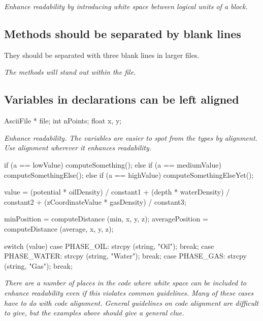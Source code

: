 \documentclass[a4paper,11pt,oneside]{scrbook}
\newcommand{\guideline}[1]{{\subsection{#1}}}
\newcommand{\motivation}[1]{{\normalfont \itshape #1}}
\begin{document}
\motivation{
  Enhance readability by introducing white space between logical units of a block.
}

\guideline{Methods should be separated by blank lines}

They should be separated with three blank lines in larger files.

\motivation{
  The methods will stand out within the file.
}

\guideline{Variables in declarations can be left aligned}

\begin{code}
  AsciiFile *  file;
  int          nPoints;
  float        x, y;
\end{code}

\motivation{
  Enhance readability. The variables are easier to spot from the types by alignment.
  Use alignment wherever it enhances readability. 
}

\begin{code}
  if      (a == lowValue)    computeSomething();
  else if (a == mediumValue) computeSomethingElse();
  else if (a == highValue)   computeSomethingElseYet();

  value = (potential        * oilDensity)   / constant1 +
          (depth            * waterDensity) / constant2 +
          (zCoordinateValue * gasDensity)   / constant3;

  minPosition     = computeDistance (min,     x, y, z);
  averagePosition = computeDistance (average, x, y, z);

  switch (value) {
    case PHASE_OIL:   strcpy (string, "Oil");   break;
    case PHASE_WATER: strcpy (string, "Water"); break;
    case PHASE_GAS:   strcpy (string, "Gas");   break;
  } 
\end{code}

\motivation{
  There are a number of places in the code where white space can be
  included to enhance readability even if this violates common
  guidelines. Many of these cases have to do with code
  alignment. General guidelines on code alignment are difficult to give,
  but the examples above should give a general clue.
}

\end{document}
